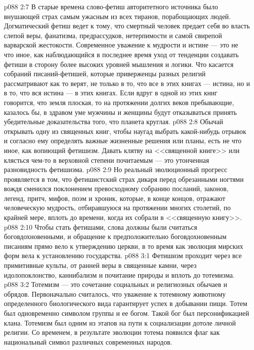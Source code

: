 \vs p088 2:7 В старые времена слово\hyp{}фетиш авторитетного источника было внушающей страх  самым ужасным из всех тиранов, порабощающих людей. Догматический фетиш ведет к тому, что смертный человек предает себя во власть слепой веры, фанатизма, предрассудков, нетерпимости и самой свирепой варварской жестокости. Современное уважение к мудрости и истине --- это не что иное, как наблюдающийся в последнее время уход от тенденции создавать фетиши в сторону более высоких уровней мышления и логики. Что касается собраний писаний\hyp{}фетишей, которые приверженцы разных религий рассматривают как  то верят, не только в то, что все в этих книгах --- истина, но и в то, что вся истина --- в этих книгах. Если вдруг в одной из этих книг говорится, что земля плоская, то на протяжении долгих веков пребывающие, казалось бы, в здравом уме мужчины и женщины будут отказываться принять убедительные доказательства того, что планета круглая.
\vs p088 2:8 Обычай открывать одну из священных книг, чтобы наугад выбрать какой\hyp{}нибудь отрывок и согласно ему определять важные жизненные решения или планы, есть не что иное, как вопиющий фетишизм. Давать клятву на <<священной книге>> или клясться чем\hyp{}то в верховной степени почитаемым --- это утонченная разновидность фетишизма.
\vs p088 2:9 Но реальный эволюционный прогресс проявляется в том, что фетишистский страх дикаря перед обрезанными ногтями вождя сменился поклонением превосходному собранию посланий, законов, легенд, притч, мифов, поэм и хроник, которые, в конце концов, отражают человеческую мудрость, отбиравшуюся на протяжении многих столетий, по крайней мере, вплоть до времени, когда их собрали в <<священную книгу>>.
\vs p088 2:10 Чтобы стать фетишами, слова должны были считаться боговдохновенными, и обращение к предположительно боговдохновенным писаниям прямо вело к утверждению  церкви, в то время как эволюция мирских форм вела к установлению  государства.
\vs p088 3:1 Фетишизм проходит через все примитивные культы, от ранней веры в священные камни, через идолопоклонство, каннибализм и почитание природы и вплоть до тотемизма.
\vs p088 3:2 Тотемизм --- это сочетание социальных и религиозных обычаев и обрядов. Первоначально считалось, что уважение к тотемному животному определенного биологического вида гарантирует успех в добывании пищи. Тотем был одновременно символом группы и ее богом. Такой бог был персонификацией клана. Тотемизм был одним из этапов на пути к социализации дотоле личной религии. Со временем, в результате эволюции тотема появился флаг как национальный символ различных современных народов.
